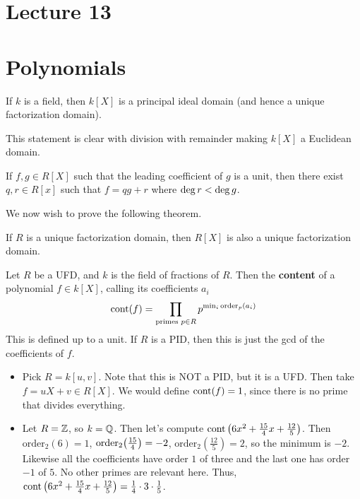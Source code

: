 \section{Lecture 13}
\section{Polynomials}
\begin{theorem}
If $k$ is a field, then $k[X]$ is a principal ideal domain (and hence a unique factorization domain).
\end{theorem}
This statement is clear with division with remainder making $k[X]$ a Euclidean domain.
\begin{theorem}
    If $f, g \in R[X]$ such that the leading coefficient of $g$ is a unit,
    then there exist $q, r \in R[x]$ such that $f = qg + r$ where $\operatorname{deg} r < \operatorname{deg} g$.
\end{theorem}

We now wish to prove the following theorem.

\begin{theorem}
    If $R$ is a unique factorization domain, then $R[X]$ is also a unique factorization domain.
\end{theorem}

\begin{definition}
    Let $R$ be a UFD, and $k$ is the field of fractions of $R$.
    Then the \textbf{content} of a polynomial $f \in k[X]$, calling its coefficients $a_i$
    \begin{align*}
        \operatorname{cont}(f) = \prod_{\text{primes } p \in R} p^{\min_i \text{order}_p (a_i)}
    \end{align*}
    This is defined up to a unit.
    If $R$ is a PID, then this is just the gcd of the coefficients of $f$.
\end{definition}

\begin{example}
    \begin{itemize}
    \item Pick $R = k[u, v]$. Note that this is NOT a PID, but it is a UFD.
    Then take $f = uX + v \in R[X]$. We would define $\operatorname{cont}(f) = 1$, since there is no prime that divides everything.
    \item Let $R = \operatorname{\mathbb{Z}}$, so $k = \operatorname{\mathbb{Q}}$. Then let's compute $\operatorname{cont}\qty(6x^2 + \frac{15}{4}x + \frac{12}{5})$.
    Then $\text{order}_2(6) = 1$, $\text{order}_2\qty(\frac{15}{4}) = -2$, $\text{order}_2(\frac{12}{5}) = 2$,
    so the minimum is $-2$. Likewise all the coefficients have order $1$ of three and the last one has order $-1$ of $5$. No other primes are relevant here.
    Thus, $\operatorname{cont}\qty(6x^2 + \frac{15}{4}x + \frac{12}{5}) = \frac{1}{4} \cdot 3 \cdot \frac{1}{5}$.
    \end{itemize}
\end{example}


